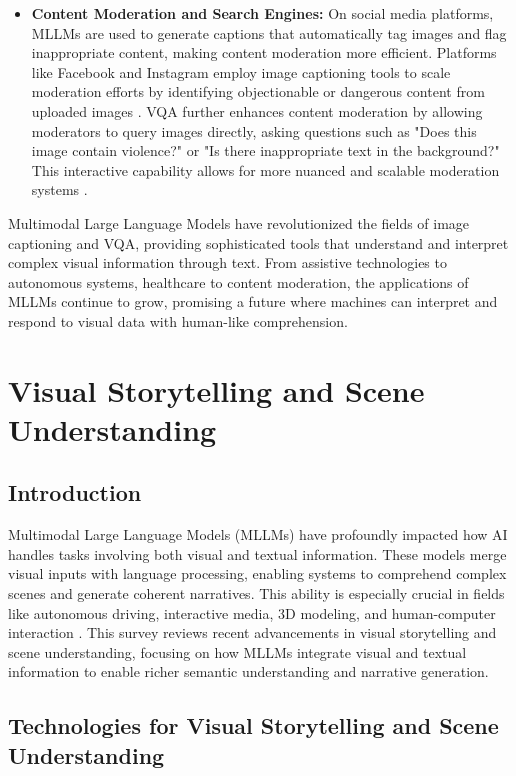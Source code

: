 \documentclass{article}
\begin{document}
\begin{itemize}
    \item \textbf{Content Moderation and Search Engines:} On social media platforms, MLLMs are used to generate captions that automatically tag images and flag inappropriate content, making content moderation more efficient. Platforms like Facebook and Instagram employ image captioning tools to scale moderation efforts by identifying objectionable or dangerous content from uploaded images \cite{icmeta2020content}. VQA further enhances content moderation by allowing moderators to query images directly, asking questions such as "Does this image contain violence?" or "Is there inappropriate text in the background?" This interactive capability allows for more nuanced and scalable moderation systems \cite{moderation_vqa2021}.
\end{itemize}


Multimodal Large Language Models have revolutionized the fields of image captioning and VQA, providing sophisticated tools that understand and interpret complex visual information through text. From assistive technologies to autonomous systems, healthcare to content moderation, the applications of MLLMs continue to grow, promising a future where machines can interpret and respond to visual data with human-like comprehension.

\section{Visual Storytelling and Scene Understanding}

\subsection{Introduction}

Multimodal Large Language Models (MLLMs) have profoundly impacted how AI handles tasks involving both visual and textual information. These models merge visual inputs with language processing, enabling systems to comprehend complex scenes and generate coherent narratives. This ability is especially crucial in fields like autonomous driving, interactive media, 3D modeling, and human-computer interaction \cite{vs2024li,vs2020hong}. This survey reviews recent advancements in visual storytelling and scene understanding, focusing on how MLLMs integrate visual and textual information to enable richer semantic understanding and narrative generation.

\subsection{Technologies for Visual Storytelling and Scene Understanding}
\end{document}
